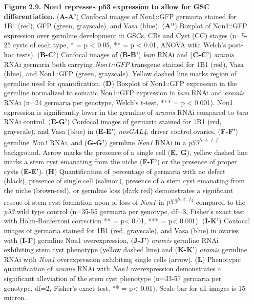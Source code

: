 \documentclass[12pt,oneside]{reedthesis}
\begin{document}
\textbf{Figure 2.9. Non1 represses p53 expression to allow for GSC
differentiation.} (\textbf{A-A'}) Confocal images of Non1::GFP germaria
stained for 1B1 (red), GFP (green, grayscale), and Vasa (blue).
(\textbf{A''}) Boxplot of Non1::GFP expression over germline development in
GSCs, CBs and Cyst (CC) stages (n=5-25 cysts of each type, * = p \textless{}
0.05, ** = p \textless{} 0.01, ANOVA with Welch's post-hoc tests). (\textbf{B-C'})
Confocal images of (\textbf{B-B'}) \emph{bam} RNAi and (\textbf{C-C'}) \emph{aramis} RNAi
germaria both carrying \emph{Non1::GFP} transgene stained for 1B1 (red), Vasa
(blue), and Non1::GFP (green, grayscale). Yellow dashed line marks
region of germline used for quantification. (\textbf{D}) Boxplot of Non1::GFP
expression in the germline normalized to somatic Non1::GFP expression in
\emph{bam} RNAi and \emph{aramis} RNAi (n=24 germaria per genotype, Welch's
t-test, *** = p \textless{} 0.001). Non1 expression is significantly lower in
the germline of \emph{aramis} RNAi compared to \emph{bam} RNAi control. (\textbf{E-G'})
Confocal images of germaria stained for 1B1 (red, grayscale), and Vasa
(blue) in (\textbf{E-E'}) \emph{nosGAL4}, driver control ovaries, (\textbf{F-F'})
germline \emph{Non1} RNAi, and (\textbf{G-G'}) germline \emph{Non1} RNAi in a
\emph{p53\textsuperscript{5-A-1-4}} background. Arrow marks the presence of a single cell
(\textbf{E, G}), yellow dashed line marks a stem cyst emanating from the
niche (\textbf{F-F'}) or the presence of proper cysts (\textbf{E-E'}). (\textbf{H})
Quantification of percentage of germaria with no defect (black),
presence of single cell (salmon), presence of a stem cyst emanating from
the niche (brown-red), or germline loss (dark red) demonstrates a
significant rescue of stem cyst formation upon of loss of \emph{Non1} in
\emph{p53\textsuperscript{5-A-14}} compared to the \emph{p53} wild type control (n=35-55 germaria
per genotype, df=3, Fisher's exact test with Holm-Bonferroni correction
** = p\textless{} 0.01, *** = p\textless{} 0.001). (\textbf{I-K'}) Confocal images of
germaria stained for 1B1 (red, grayscale), and Vasa (blue) in ovaries
with (\textbf{I-I'}) germline Non1 overexpression, (\textbf{J-J'}) \emph{aramis}
germline RNAi exhibiting stem cyst phenotype (yellow dashed line) and
(\textbf{K-K}') \emph{aramis} germline RNAi with \emph{Non1} overexpression exhibiting
single cells (arrow). (\textbf{L}) Phenotypic quantification of \emph{aramis} RNAi
with \emph{Non1} overexpression demonstrates a significant alleviation of the
stem cyst phenotype (n=33-57 germaria per genotype, df=2, Fisher's exact
test, ** = p\textless{} 0.01). Scale bar for all images is 15 micron.
\end{document}
